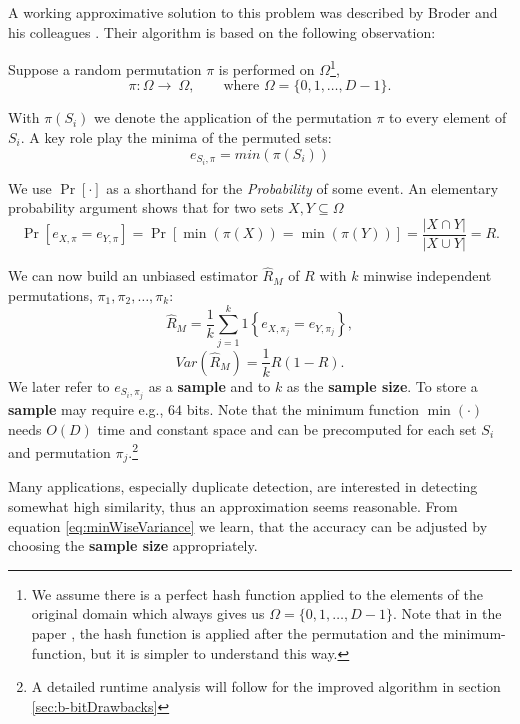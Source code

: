 \documentclass[a4paper]{article}
\begin{document}
A working approximative solution to this problem was described by Broder and his colleagues \citep{Broder:1998,BroderGMZ97}. Their algorithm is based on the following observation:

Suppose a random permutation $\pi$ is performed on $\Omega$\footnote{We assume there is a perfect hash function applied to the elements of the original domain which always gives us $\Omega = \{0,1,\ldots,D-1\}$. Note that in the paper \citep{LiK11}, the hash function is applied after the permutation and the minimum-function, but it is simpler to understand this way.},
\[
\pi:\Omega \longrightarrow\ \Omega, \qquad \text{where } \Omega = \{0,1,\ldots,D-1\}.
\]


With $\pi(S_i)$ we denote the application of the permutation $\pi$ to every element of $S_i$. A key role play the minima of the permuted sets:
\[
e_{S_i,\pi}=min(\pi(S_i))
\]

We use $\Pr[\cdot]$ as a shorthand for the \emph{Probability} of some event. An elementary probability argument shows that for two sets $X,Y \subseteq \Omega$
\begin{equation}\label{eq:minwiseOri}
\Pr[e_{X,\pi}=e_{Y,\pi}]=\Pr [\min(\pi(X))=\min(\pi(Y))]=\frac{\left| X \cap Y \right|}{\left| X \cup Y \right|}=R.
\end{equation}

We can now build an unbiased estimator $\hat{R}_M$ of $R$ with $k$ minwise independent permutations, $\pi_1,\pi_2,\ldots,\pi_k$:
\begin{equation}
\hat{R}_M=\frac{1}{k}\sum_{j=1}^k 1 \left\lbrace e_{X,\pi_j}=e_{Y,\pi_j} \right\rbrace,
\end{equation}
\begin{equation}\label{eq:minWiseVariance}
Var(\hat{R}_M)=\frac{1}{k}R(1-R).
\end{equation}
We later refer to $e_{S_i,\pi_j}$ as a \textbf{sample} and to $k$ as the \textbf{sample size}. To store a \textbf{sample} may require e.g., $64$ bits. Note that the minimum function $\min(\cdot)$ needs $O(D)$ time and constant space and can be precomputed for each set $S_i$ and permutation $\pi_j$.\footnote{A detailed runtime analysis will follow for the improved algorithm in section \vref{sec:b-bitDrawbacks}}

Many applications, especially duplicate detection, are interested in detecting somewhat high similarity, thus an approximation seems reasonable. From equation \vref{eq:minWiseVariance} we learn, that the accuracy can be adjusted by choosing the \textbf{sample size} appropriately.
\end{document}
